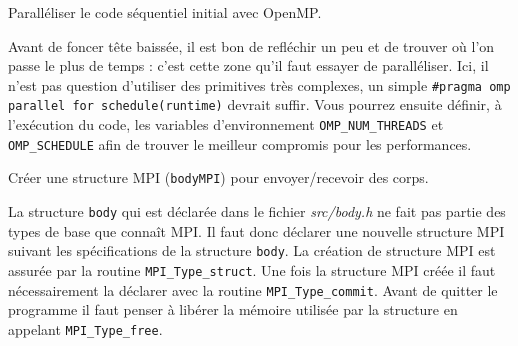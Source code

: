 \begin{questions}
	\question Paralléliser le code séquentiel initial avec OpenMP.
	\begin{solution}
		Avant de foncer tête baissée, il est bon de refléchir un peu et de trouver où l'on passe le plus de temps : c'est cette zone qu'il faut essayer de paralléliser.
		Ici, il n'est pas question d'utiliser des primitives très complexes, un simple \texttt{\#pragma omp parallel for schedule(runtime)} devrait suffir.
		Vous pourrez ensuite définir, à l'exécution du code, les variables d'environnement \texttt{OMP\_NUM\_THREADS} et \texttt{OMP\_SCHEDULE} afin de trouver le meilleur compromis pour les performances. 
	\end{solution}

	\question Créer une structure MPI (\texttt{bodyMPI}) pour envoyer/recevoir des corps.
	\begin{solution}
		La structure \texttt{body} qui est déclarée dans le fichier \textit{src/body.h} ne fait pas partie des types de base que connaît MPI.
		Il faut donc déclarer une nouvelle structure MPI suivant les spécifications de la structure \texttt{body}.
		La création de structure MPI est assurée par la routine \texttt{MPI\_Type\_struct}.
		Une fois la structure MPI créée il faut nécessairement la déclarer avec la routine \texttt{MPI\_Type\_commit}.
		Avant de quitter le programme il faut penser à libérer la mémoire utilisée par la structure en appelant \texttt{MPI\_Type\_free}.
	\end{solution}


\end{questions}
